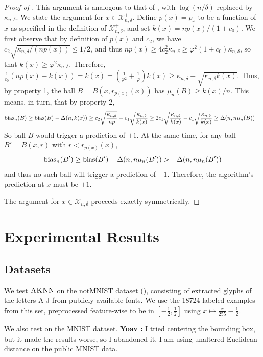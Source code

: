 \documentclass{article}
\def\X{{\mathcal X}}
\def\bias{{\rm bias}}
\newcommand{\algname}{\textsc{AKNN}}
\newcommand{\comment}[3]{{\color{#1} {\bf #2 :} #3}}
\newcommand{\yoav}[1]{\comment{green}{Yoav}{#1}}
\begin{document}
\begin{proof}[Proof of ]
This argument is analogous to that of , with $\log (n/\delta)$ replaced by $\kappa_{n, \delta}$. We state the argument for $x \in \X^+_{n,\delta}$. Define $p(x) = p_x$ to be a function of $x$ as specified in the definition of $\X^+_{n,\delta}$, and set $k(x) = np(x) / (1 + c_0)$. We first observe that by definition of $p(x)$ and $c_2$, we have $c_2 \sqrt{\kappa_{n, \delta}/(n p(x))} \leq 1/2$, and thus $np(x) \geq 4 c_2^2 \kappa_{n, \delta} \geq \varphi^2 (1+c_0) \kappa_{n, \delta}$, so that $k(x) \geq \varphi^2 \kappa_{n, \delta}$. Therefore, $\frac{1}{c_0} (np(x) - k(x)) = k(x) = \left( \frac{1}{\varphi^2} + \frac{1}{\varphi} \right) k(x) \geq \kappa_{n, \delta} + \sqrt{ \kappa_{n, \delta} k(x) }$. Thus, by property 1, the ball $B = B(x, r_{p(x)} (x))$ has $\mu_n(B) \geq k(x)/n$. This means, in turn, that by property 2, 
\begin{align*}
\bias_n(B) &\geq \bias(B) - \Delta(n, k(x) ) 
\geq c_2 \sqrt{\frac{\kappa_{n, \delta}}{np}} - c_1 \sqrt{\frac{\kappa_{n, \delta}}{k(x)}} 
\geq 2c_1 \sqrt{\frac{\kappa_{n, \delta}}{k(x)}} - c_1 \sqrt{\frac{\kappa_{n, \delta}}{k(x)}} 
\geq \Delta(n, n \mu_n(B))
\end{align*}
So ball $B$ would trigger a prediction of $+1$.
At the same time, for any ball $B' = B(x, r)$ with $r < r_{p(x)} (x)$,
$$ \bias_n(B') \geq \bias(B') - \Delta(n, n \mu_n(B')) > -\Delta(n, n \mu_n(B')) $$
and thus no such ball will trigger a prediction of $-1$. Therefore, the algorithm's prediction at $x$ must be $+1$.

The argument for $x \in \X^-_{n,\delta}$ proceeds exactly symmetrically. 
\end{proof}

\section{Experimental Results}

\subsection{Datasets}

We test $\algname$ on the notMNIST dataset (\cite{notMNIST}), consisting of extracted glyphs of the letters A-J from publicly available fonts. We use the 18724 labeled examples from this set, preprocessed feature-wise to be in $[-\frac{1}{2}, \frac{1}{2}]$ using $x \mapsto \frac{x}{255} - \frac{1}{2}$.

We also test on the MNIST dataset. \yoav{I tried centering the bounding box, but it made the results worse, so I abandoned it. I am using unaltered Euclidean distance on the public MNIST data.}
\end{document}
